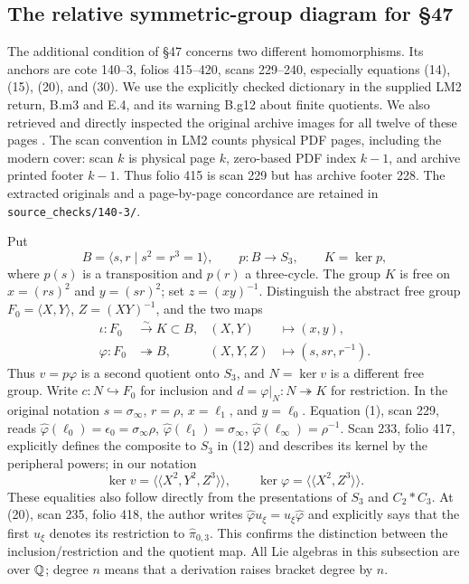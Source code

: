 \subsection{The relative symmetric-group diagram for \S47}

The additional condition of \S47 concerns two different homomorphisms.
Its anchors are cote 140--3, folios 415--420, scans 229--240, especially
equations (14), (15), (20), and (30). We use the explicitly checked
dictionary in the supplied LM2 return, B.m3 and E.4, and its warning
B.g12 about finite quotients. We also retrieved and directly inspected
the original archive images for all twelve of these pages
\citep[\S47, physical PDF pp.~229--240]{GrothendieckLM1403Original}.
The scan convention in LM2 counts physical PDF pages, including the
modern cover: scan $k$ is physical page $k$, zero-based PDF index
$k-1$, and archive printed footer $k-1$. Thus folio 415 is scan 229
but has archive footer 228. The extracted originals and a page-by-page
concordance are retained in \texttt{source\_checks/140-3/}.

Put
\[
 B=\langle s,r\mid s^2=r^3=1\rangle,
 \qquad p:B\longrightarrow S_3,
 \qquad K=\ker p,
\]
where $p(s)$ is a transposition and $p(r)$ a three-cycle. The group $K$
is free on $x=(rs)^2$ and $y=(sr)^2$; set $z=(xy)^{-1}$. Distinguish
the abstract free group $F_0=\langle X,Y\rangle$, $Z=(XY)^{-1}$, and
the two maps
\[
 \begin{aligned}
 \iota:F_0&\stackrel{\sim}{\longrightarrow}K\subset B,
      &(X,Y)&\longmapsto(x,y),\\
 \varphi:F_0&\twoheadrightarrow B,
      &(X,Y,Z)&\longmapsto(s,sr,r^{-1}).
 \end{aligned}
\]
Thus $v=p\varphi$ is a second quotient onto $S_3$, and
$N=\ker v$ is a different free group. Write $c:N\hookrightarrow F_0$
for inclusion and $d=\varphi|_N:N\twoheadrightarrow K$ for restriction.
In the original notation $s=\sigma_\infty$, $r=\rho$, $x=\ell_1$,
and $y=\ell_0$. Equation (1), scan 229, reads
$\widehat\varphi(\ell_0)=\epsilon_0=\sigma_\infty\rho$,
$\widehat\varphi(\ell_1)=\sigma_\infty$,
$\widehat\varphi(\ell_\infty)=\rho^{-1}$.
Scan 233, folio 417, explicitly defines the composite to $S_3$ in
(12) and describes its kernel by the peripheral powers; in our notation
\[
 \ker v=\langle\!\langle X^2,Y^2,Z^3\rangle\!\rangle,
 \qquad
 \ker\varphi=\langle\!\langle X^2,Z^3\rangle\!\rangle.
\]
These equalities also follow directly from the presentations of
$S_3$ and $C_2*C_3$. At (20), scan 235, folio 418, the author writes
$\widehat\varphi u_\xi=u_\xi\widehat\varphi$ and explicitly says that
the first $u_\xi$ denotes its restriction to $\widehat\pi_{0,3}$.
This confirms the distinction between the inclusion/restriction and
the quotient map.
All Lie algebras in this subsection are over $\mathbb Q$; degree $n$ means
that a derivation raises bracket degree by $n$.

